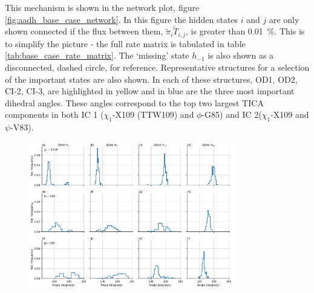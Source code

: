  This mechanism is shown in the network plot, figure \ref{fig:aadh_base_case_network}. In this figure the hidden states $i$ and $j$ are only shown connected if the flux between them, $\tilde{\pi}_{i}\tilde{T}_{i,j}$, is greater than \SI{0.01}{\percent}. This is to simplify the picture - the full rate matrix is tabulated in table \ref{tab:base_case_rate_matrix}. The `missing' state $h_{-1}$ is also shown as a disconnected, dashed circle, for reference. Representative structures for a selection of the important states are also shown. In each of these structures, OD1, OD2, CI-2, CI-3, are highlighted in yellow and in blue are the three most important dihedral angles. These angles correspond to the top two largest TICA components in both IC 1 ($\chi_1$-X109 (TTW109) and $\phi$-G85) and IC 2($\chi_1$-X109 and $\psi$-V83). 
 
\begin{figure}
    \centering
    \label{fig:aadh_base_case_dihedrals}
    \includegraphics[width=0.8\textwidth]{chapters/aadh/figures/base_case_important_dihedrals.png}
\end{figure}


